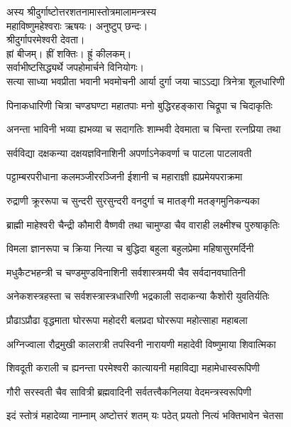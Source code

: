 
अस्य श्रीदुर्गाष्टोत्तरशतनामास्तोत्रमालामन्त्रस्य\\
महाविष्णुमहेश्वराः ऋषयः। अनुष्टुप् छन्दः।\\
श्रीदुर्गापरमेश्वरी देवता।\\
ह्रां बीजम्। ह्रीं शक्तिः। ह्रूं कीलकम्।\\
सर्वाभीष्टसिद्ध्यर्थे जपहोमार्चने विनियोगः।\\

\twolineshloka
{सत्या साध्या भवप्रीता भवानी भवमोचनी}
{आर्या दुर्गा जया चाऽऽद्या त्रिनेत्रा शूलधारिणी}

\twolineshloka
{पिनाकधारिणी चित्रा चण्डघण्टा महातपाः}
{मनो बुद्धिरहङ्कारा चिद्रूपा च चिदाकृतिः}

\twolineshloka
{अनन्ता भाविनी भव्या ह्यभव्या च सदागतिः}
{शाम्भवी देवमाता च चिन्ता रत्नप्रिया तथा}

\twolineshloka
{सर्वविद्या दक्षकन्या दक्षयज्ञविनाशिनी}
{अपर्णाऽनेकवर्णा च पाटला पाटलावती}

\twolineshloka
{पट्टाम्बरपरीधाना कलमञ्जीररञ्जिनी}
{ईशानी च महाराज्ञी ह्यप्रमेयपराक्रमा}

\twolineshloka
{रुद्राणी क्रूररूपा च सुन्दरी सुरसुन्दरी}
{वनदुर्गा च मातङ्गी मतङ्गमुनिकन्यका}

\twolineshloka
{ब्राह्मी माहेश्वरी चैन्द्री कौमारी वैष्णवी तथा}
{चामुण्डा चैव वाराही लक्ष्मीश्च पुरुषाकृतिः}

\twolineshloka
{विमला ज्ञानरूपा च क्रिया नित्या च बुद्धिदा}
{बहुला बहुलप्रेमा महिषासुरमर्दिनी}

\twolineshloka
{मधुकैटभहन्त्री च चण्डमुण्डविनाशिनी}
{सर्वशास्त्रमयी चैव सर्वदानवघातिनी}

\twolineshloka
{अनेकशस्त्रहस्ता च सर्वशस्त्रास्त्रधारिणी}
{भद्रकाली सदाकन्या कैशोरी युवतिर्यतिः}

\twolineshloka
{प्रौढाऽप्रौढा वृद्धमाता घोररूपा महोदरी}
{बलप्रदा घोररूपा महोत्साहा महाबला}

\twolineshloka
{अग्निज्वाला रौद्रमुखी कालरात्री तपस्विनी}
{नारायणी महादेवी विष्णुमाया शिवात्मिका}

\twolineshloka
{शिवदूती कराली च ह्यनन्ता परमेश्वरी}
{कात्यायनी महाविद्या महामेधास्वरूपिणी}

\twolineshloka
{गौरी सरस्वती चैव सावित्री ब्रह्मवादिनी}
{सर्वतत्त्वैकनिलया वेदमन्त्रस्वरूपिणी}

\twolineshloka
{इदं स्तोत्रं महादेव्या नाम्नाम् अष्टोत्तरं शतम्}
{यः पठेत् प्रयतो नित्यं भक्तिभावेन चेतसा}

